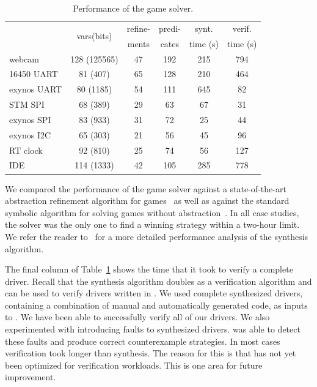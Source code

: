 \begin{table}
    \center
    \begin{tabular}{|l|ccccc|}
        \hline
                       & \multirow{2}{*}{vars(bits)} & refine- & predi- & synt.     & verif.   \\
                       &                             & ments   & cates  & time (s)  & time (s) \\
        \hline
        \hline
        webcam         & 128 (125565)                & 47      & 192    & 215       & 794 \\
        16450 UART     & 81  (407)                   & 65      & 128    & 210       & 464 \\
        exynos UART    & 80  (1185)                  & 54      & 111    & 645       & 82 \\
        STM SPI        & 68  (389)                   & 29      & 63     & 67        & 31 \\
        exynos SPI     & 83  (933)                   & 31      & 72     & 25        & 44 \\
        exynos I2C     & 65  (303)                   & 21      & 56     & 45        & 96 \\
        RT clock       & 92  (810)                   & 25      & 74     & 56        & 127 \\
        IDE            & 114 (1333)                  & 42      & 105    & 285       & 778 \\
        \hline
    \end{tabular}
    \caption{Performance of the \termite game solver.}
    \label{t:perf}
\end{table}

We compared the performance of the \termite game solver against a state-of-the-art abstraction refinement algorithm for games~\cite{Alfaro_Roy_07} as well as against the standard symbolic algorithm for solving games without abstraction~\cite{Piterman_PS_06}.  In all case studies, the \termite solver was the only one to find a winning strategy within a two-hour limit.  We refer the reader to~\cite{Walker_Ryzhyk_14} for a more detailed performance analysis of the \termite synthesis algorithm.

The final column of Table~\ref{t:perf} shows the time that it took \termite to verify a complete driver.  Recall that the \termite synthesis algorithm doubles as a verification algorithm and can be used to verify drivers written in \tsl.  We used complete synthesized drivers, containing a combination of manual and automatically generated code, as inputs to \termite.  We have been able to successfully verify all of our drivers.  We also experimented with introducing faults to synthesized drivers.  \termite was able to detect these faults and produce correct counterexample strategies.  In most cases verification took longer than synthesis.  The reason for this is that \termite has not yet been optimized for verification workloads.  This is one area for future improvement.

